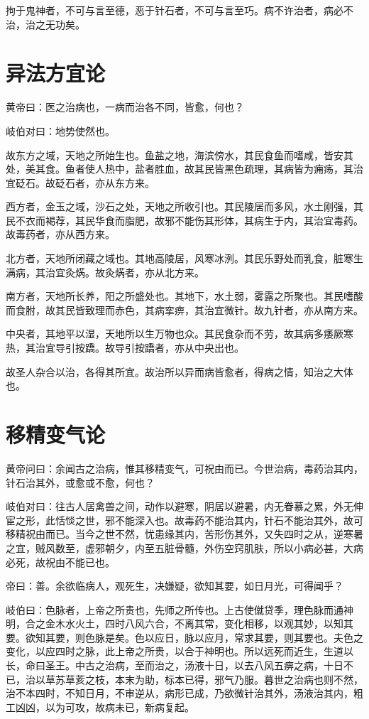 \documentclass{article}%
\begin{document}
拘于鬼神者，不可与言至德，恶于针石者，不可与言至巧。病不许治者，病必不治，治之无功矣。


\section{异法方宜论}
黄帝曰：医之治病也，一病而治各不同，皆愈，何也？

岐伯对曰：地势使然也。

故东方之域，天地之所始生也。鱼盐之地，海滨傍水，其民食鱼而嗜咸，皆安其处，美其食。鱼者使人热中，盐者胜血，故其民皆黑色疏理，其病皆为痈疡，其治宜砭石。故砭石者，亦从东方来。

西方者，金玉之域，沙石之处，天地之所收引也。其民陵居而多风，水土刚强，其民不衣而褐荐，其民华食而脂肥，故邪不能伤其形体，其病生于内，其治宜毒药。故毒药者，亦从西方来。

北方者，天地所闭藏之域也。其地高陵居，风寒冰洌。其民乐野处而乳食，脏寒生满病，其治宜灸焫。故灸焫者，亦从北方来。

南方者，天地所长养，阳之所盛处也。其地下，水土弱，雾露之所聚也。其民嗜酸而食胕，故其民皆致理而赤色，其病挛痹，其治宜微针。故九针者，亦从南方来。

中央者，其地平以湿，天地所以生万物也众。其民食杂而不劳，故其病多痿厥寒热，其治宜导引按蹻。故导引按蹻者，亦从中央出也。

故圣人杂合以治，各得其所宜。故治所以异而病皆愈者，得病之情，知治之大体也。
\section{移精变气论}
黄帝问曰：余闻古之治病，惟其移精变气，可祝由而已。今世治病，毒药治其内，针石治其外，或愈或不愈，何也？

岐伯对曰：往古人居禽兽之间，动作以避寒，阴居以避暑，内无眷慕之累，外无伸宦之形，此恬惔之世，邪不能深入也。故毒药不能治其内，针石不能治其外，故可移精祝由而已。当今之世不然，忧患缘其内，苦形伤其外，又失四时之从，逆寒暑之宜，贼风数至，虚邪朝夕，内至五脏骨髓，外伤空窍肌肤，所以小病必甚，大病必死，故祝由不能已也。

帝曰：善。余欲临病人，观死生，决嫌疑，欲知其要，如日月光，可得闻乎？

岐伯曰：色脉者，上帝之所贵也，先师之所传也。上古使僦贷季，理色脉而通神明，合之金木水火土，四时八风六合，不离其常，变化相移，以观其妙，以知其要。欲知其要，则色脉是矣。色以应日，脉以应月，常求其要，则其要也。夫色之变化，以应四时之脉，此上帝之所贵，以合于神明也。所以远死而近生，生道以长，命曰圣王。中古之治病，至而治之，汤液十日，以去八风五痹之病，十日不已，治以草苏草荄之枝，本末为助，标本已得，邪气乃服。暮世之治病也则不然，治不本四时，不知日月，不审逆从，病形已成，乃欲微针治其外，汤液治其内，粗工凶凶，以为可攻，故病未已，新病复起。
\end{document}
